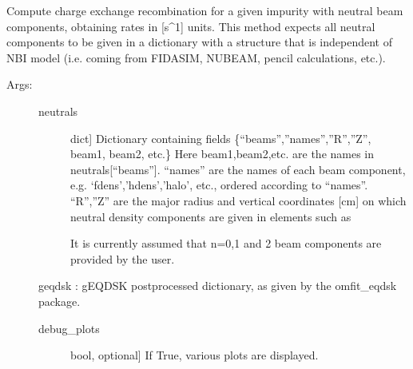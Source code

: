\documentclass[letterpaper,10pt,english]{sphinxmanual}
\begin{document}

\begin{fulllineitems}
\label{\detokenize{aurora:aurora.nbi_neutrals.get_neutrals_fsa}}
Compute charge exchange recombination for a given impurity with neutral beam components,
obtaining rates in {[}s\textasciicircum{}\sphinxhyphen{}1{]} units. This method expects all neutral components to be given in a
dictionary with a structure that is independent of NBI model (i.e. coming from FIDASIM, NUBEAM, 
pencil calculations, etc.).
\begin{description}
\item[{Args:}] \leavevmode\begin{description}
\item[{neutrals}] \leavevmode{[}dict{]}
Dictionary containing fields
\{“beams”,”names”,”R”,”Z”, beam1, beam2, etc.\}
Here beam1,beam2,etc. are the names in neutrals{[}“beams”{]}. “names” are the names of each 
beam component, e.g. ‘fdens’,’hdens’,’halo’, etc., ordered according to “names”. 
“R”,”Z” are the major radius and vertical coordinates {[}cm{]} on which neutral density components are 
given in elements such as

\begin{sphinxVerbatim}[commandchars=\\\{\}]
\PYG{p}{[}\PYG{p}{[}\PYG{p}{]}\PYG{p}{]}\PYG{p}{[}\PYG{p}{]}\PYG{p}{[}\PYG{p}{]}
\end{sphinxVerbatim}

It is currently assumed that n=0,1 and 2 beam components are provided by the user.

\end{description}

geqdsk : gEQDSK post\sphinxhyphen{}processed dictionary, as given by the omfit\_eqdsk package.
\begin{description}
\item[{debug\_plots}] \leavevmode{[}bool, optional{]}
If True, various plots are displayed.

\end{description}


\end{description}
\end{fulllineitems}
\end{document}
